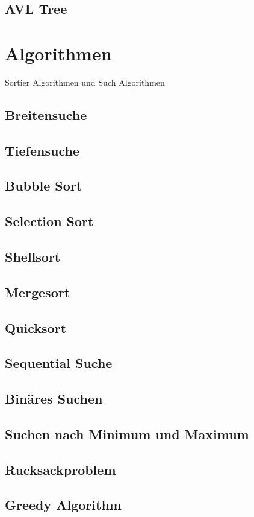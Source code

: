 \documentclass{book}
\begin{document}
\section{AVL Tree}

\chapter{Algorithmen}
Sortier Algorithmen und Such Algorithmen
\section{Breitensuche}
\section{Tiefensuche}
\section{Bubble Sort}
\section{Selection Sort}
\section{Shellsort}
\section{Mergesort}
\section{Quicksort}
\section{Sequential Suche}
\section{Binäres Suchen}
\section{Suchen nach Minimum und Maximum}
\section{Rucksackproblem}
\section{Greedy Algorithm}
\end{document}
